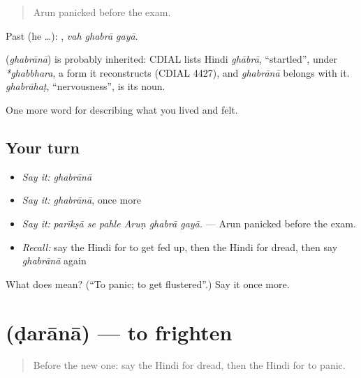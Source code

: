 \begin{quote}
Arun panicked before the exam.
\end{quote}

Past (he …):   , \emph{vah ghabrā gayā}.

\begin{cousinweb}
\textbf{} (\emph{ghabrānā}) is probably inherited: CDIAL lists Hindi \emph{ghābrā}, \textquotedblleft{}startled\textquotedblright{}, under \emph{*ghabbhara}, a form it reconstructs (CDIAL 4427), and \emph{ghabrānā} belongs with it. \emph{ghabrāhaṭ}, \textquotedblleft{}nervousness\textquotedblright{}, is its noun.
\end{cousinweb}

\begin{grammarlens}[title={What you've built}]
One more word for describing what you lived and felt.
\end{grammarlens}

\subsection*{Your turn}
\begin{itemize}
\raggedright
  \item \emph{Say it:} \emph{ghabrānā}
  \item \emph{Say it:} \emph{ghabrānā}, once more
  \item \emph{Say it:} \emph{parīkṣā se pahle Aruṇ ghabrā gayā.} — Arun panicked before the exam.
  \item \emph{Recall:} say the Hindi for to get fed up, then the Hindi for dread, then say \emph{ghabrānā} again
\end{itemize}

\begin{tcolorbox}[breakable,colback=teal!4,colframe=teal!35!black,title={Before you move on}]
What does  mean? (\textquotedblleft{}To panic; to get flustered\textquotedblright{}.) Say it once more.
\end{tcolorbox}
\section[\texorpdfstring{\hi{डराना} (ḍarānā)}{डराना (ḍarānā)}]{ (ḍarānā) — to frighten}

\label{lesson:HI-C457-darana}



\begin{quote}
Before the new one: say the Hindi for dread, then the Hindi for to panic.
\end{quote}


